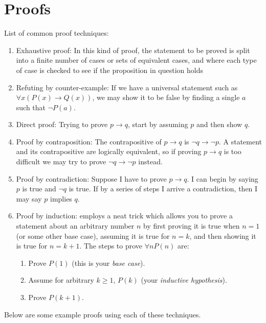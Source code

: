 \documentclass[nobib]{tufte-handout}
\begin{document}
\section{Proofs}
List of common proof techniques:
\begin{enumerate}
    \item Exhaustive proof: 
    In this kind of proof, the statement to be proved is 
    split into a finite number of cases or sets of equivalent 
    cases, and where each type of case is checked to see if 
    the proposition in question holds
    \item Refuting by counter-example: 
    If we have a universal statement such as 
    $\forall x (P(x) \rightarrow Q(x))$, we may
    show it to be false by finding a single $a$ 
    such that $\neg P(a)$. 
    \item Direct proof: 
    Trying to prove $p \rightarrow q$, start by 
    assuming $p$ and then show $q$. 
    \item Proof by contraposition: 
    The contrapositive of $p \rightarrow q$
    is $\neg q \rightarrow \neg p$. A statement 
    and its contrapositive are logically equivalent, so 
    if proving $p\rightarrow q$ is too difficult 
    we may try to prove $\neg q \rightarrow \neg p$ instead. 
    \item Proof by contradiction: 
    Suppose I have to prove $p \rightarrow q$. I can begin 
    by saying $p$ is true and $\neg q$ is true. If by a series of 
    steps I arrive a contradiction, then I may say $p$ implies $q$. 
    \item Proof by induction: employs a neat trick which 
    allows you to prove a statement about an arbitrary number 
    $n$ by first proving it is true when $n=1$ (or some other base case), 
    assuming it is true for $n=k$, and then showing it is true for $n=k+1$.
    The steps to prove $\forall n P(n)$ are:
    \begin{enumerate}
        \item Prove $P(1)$ (this is your \emph{base case}). 
        \item Assume for arbitrary $k \geq 1$, $P(k)$ (your \emph{inductive hypothesis}).
        \item Prove $P(k+1)$. 
    \end{enumerate}
\end{enumerate}
Below are some example proofs using each of these techniques. 
\end{document}
